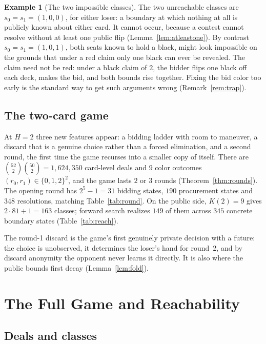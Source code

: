 \documentclass[11pt]{article}
\theoremstyle{plain}
\theoremstyle{definition}
\newtheorem{example}[theorem]{Example}
\theoremstyle{remark}
\newcommand{\seat}[1]{\ensuremath{s_{#1}}}
\begin{document}
\begin{example}[The two impossible classes]\label{ex:h1impossible}
The two unreachable classes are $\seat{0}=\seat{1}=(1,0,0)$, for either
loser: a boundary at which nothing at all is publicly known about either
card. It cannot occur, because a contest cannot resolve without at least
one public flip (Lemma~\ref{lem:atleastone}). By contrast
$\seat{0}=\seat{1}=(1,0,1)$, both seats known to hold a black, might look
impossible on the grounds that under a red claim only one black can ever be
revealed. The claim need not be red: under a black claim of $2$, the bidder
flips one black off each deck, makes the bid, and both bounds rise
together. Fixing the bid color too early is the standard way to get such
arguments wrong (Remark~\ref{rem:trap}).
\end{example}

\subsection{The two-card game}

At $H=2$ three new features appear: a bidding ladder with room to maneuver,
a discard that is a genuine choice rather than a forced elimination, and a
second round, the first time the game recurses into a smaller copy of
itself. There are $\binom{52}{2}\binom{50}{2}=1{,}624{,}350$ card-level
deals and $9$ color outcomes $(r_0,r_1)\in\{0,1,2\}^2$, and the game lasts
$2$ or $3$ rounds (Theorem~\ref{thm:rounds}). The opening round has
$2^5-1=31$ bidding states, $190$ procurement states and $348$ resolutions,
matching Table~\ref{tab:round}. On the public side, $K(2)=9$ gives
$2\cdot 81+1=163$ classes; forward search realizes $149$ of them across
$345$ concrete boundary states (Table~\ref{tab:reach}).

The round-1 discard is the game's first genuinely private decision with a
future: the choice is unobserved, it determines the loser's hand for
round~2, and by discard anonymity the opponent never learns it directly.
It is also where the public bounds first decay (Lemma~\ref{lem:fold}).

\section{The Full Game and Reachability}\label{sec:full}

\subsection{Deals and classes}
\end{document}
